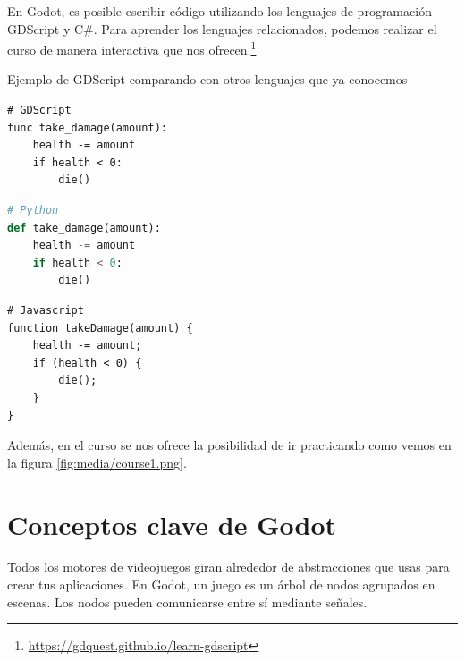 \documentclass[12pt]{report} %
\begin{document}
En Godot, es posible escribir código utilizando los lenguajes de
programación GDScript y C\#. Para aprender los lenguajes relacionados,
podemos realizar el curso de manera interactiva que nos
ofrecen.\footnote{\url{https://gdquest.github.io/learn-gdscript}}

Ejemplo de GDScript comparando con otros lenguajes que ya conocemos

\begin{lstlisting}
# GDScript
func take_damage(amount):
    health -= amount
    if health < 0:
        die()
\end{lstlisting}

\begin{lstlisting}[language=Python]
# Python
def take_damage(amount):
    health -= amount
    if health < 0:
        die()
\end{lstlisting}

\begin{lstlisting}
# Javascript
function takeDamage(amount) {
    health -= amount;
    if (health < 0) {
        die();
    }
}
\end{lstlisting}

Además, en el curso se nos ofrece la posibilidad de ir practicando como
vemos en la figura \ref{fig:media/course1.png}.


\hypertarget{conceptos-clave-de-godot}{%
\section{Conceptos clave de Godot}\label{conceptos-clave-de-godot}}

Todos los motores de videojuegos giran alrededor de abstracciones que
usas para crear tus aplicaciones. En Godot, un juego es un árbol de
nodos agrupados en escenas. Los nodos pueden comunicarse entre sí
mediante señales.
\end{document}
